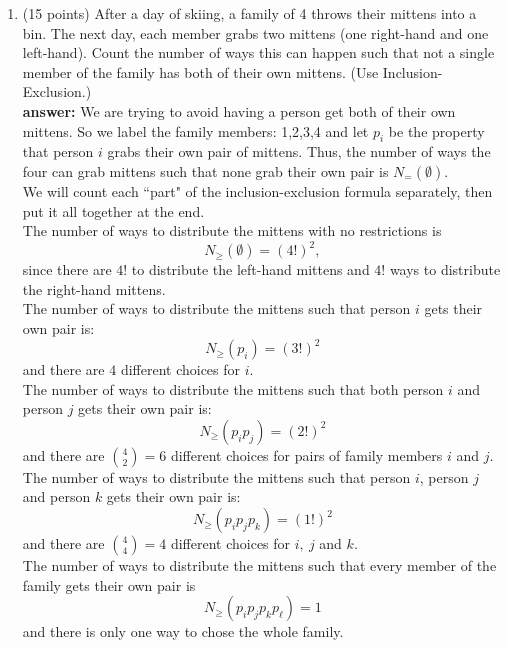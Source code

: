 \documentclass[11pt]{article}
\begin{document}
\newpage
\vspace*{-0.3in}
\begin{enumerate}
\item (15 points) After a day of skiing, a family of 4 throws their mittens into a bin. The next day, each member grabs two mittens (one right-hand and one left-hand). Count the number of ways this can happen such that not a single member of the family has both of their own mittens. (Use Inclusion-Exclusion.)\\

\vspace{.5in}
\textbf{answer:} We are trying to avoid having a person get both of their own mittens. So we label the family members: 1,2,3,4 and let $p_i$ be the property that person $i$ grabs their own pair of mittens.  Thus, the number of ways the four can grab mittens such that none grab their own pair is $N_{=}( \emptyset).$ \\

We will count each ``part" of the inclusion-exclusion formula separately, then put it all together at the end.\\

The number of ways to distribute the mittens with no restrictions is\\ 
$$N_{\geq}( \emptyset)=(4!)^2,$$ since there are $4!$ to distribute the left-hand mittens and $4!$ ways to distribute the right-hand mittens.\\

The number of ways to distribute the mittens such that person $i$ gets their own pair is: 
$$N_{\geq}(p_i)=(3!)^2$$ and there are $4$ different choices for $i$.\\  

The number of ways to distribute the mittens such that both person $i$ and person $j$ gets their own pair is: 
$$N_{\geq}(p_i p_j)=(2!)^2$$ and there are ${4 \choose 2}=6$ different choices for pairs of family members $i$ and $j.$\\

The number of ways to distribute the mittens such that person $i$, person $j$ and person $k$ gets their own pair is: 
$$N_{\geq}(p_ip_jp_k)=(1!)^2$$ and there are ${4 \choose 4}=4$ different choices for $i,\: j$ and $k.$\\

The number of ways to distribute the mittens such that every member of the family gets their own pair is
$$N_{\geq}(p_ip_jp_kp_\ell)=1$$ and there is only one way to chose the whole family.\\


\end{enumerate}
\end{document}
